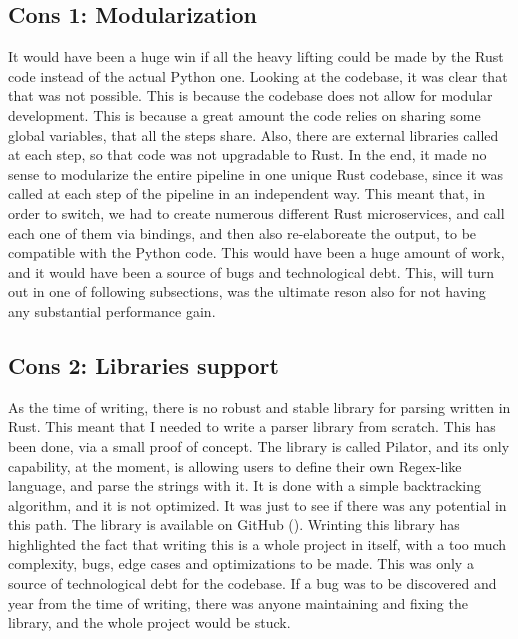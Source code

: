 \subsection[Modularization]{Cons 1: Modularization}
It would have been a huge win if all the heavy lifting could be made by the Rust
code instead of the actual Python one. Looking at the codebase, it was clear that
that was not possible. This is because the codebase does not allow for modular
development. This is because a great amount the code relies on sharing some global
variables, that all the steps share. Also, there are external libraries called
at each step, so that code was not upgradable to Rust. In the end, it made no sense
to modularize the entire pipeline in one unique Rust codebase, since it was
called at each step of the pipeline in an independent way. This meant that, in
order to switch, we had to create numerous different Rust microservices, and
call each one of them via bindings, and then also re-elaboreate the output, to
be compatible with the Python code. This would have been a huge amount of work,
and it would have been a source of bugs and technological debt. This, will turn
out in one of following subsections, was the ultimate reson also for not having any
substantial performance gain.

\subsection[Libraries support]{Cons 2: Libraries support}
As the time of writing, there is no robust and stable library for parsing
written in Rust. This meant that I needed to write a parser library from scratch.
This has been done, via a small proof of concept. The library is called Pilator,
and its only capability, at the moment, is allowing users to define their own Regex-like
language, and parse the strings with it. It is done with a simple backtracking algorithm,
and it is not optimized. It was just to see if there was any potential in this path.
The library is available on GitHub (\cite{pilator}). Wrinting this library has highlighted
the fact that writing this is a whole project in itself, with a too much
complexity, bugs, edge cases and optimizations to be made. This was only a source
of technological debt for the codebase. If a bug was to be discovered and year
from the time of writing, there was anyone maintaining and fixing the library,
and the whole project would be stuck.

